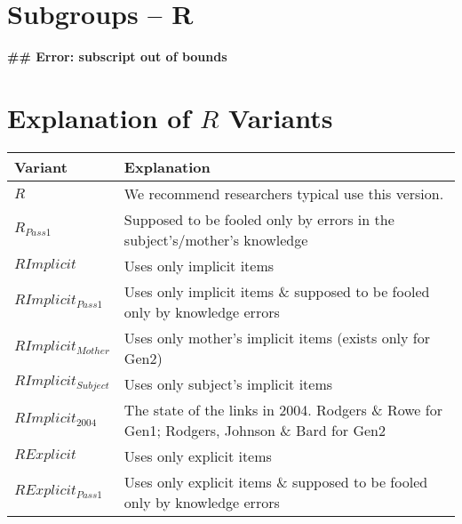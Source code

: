 \documentclass{article}\usepackage{graphicx, color}
\makeatletter
\newenvironment{kframe}{%
 \def\at@end@of@kframe{}%
 \ifinner\ifhmode%
  \def\at@end@of@kframe{\end{minipage}}%
  \begin{minipage}{\columnwidth}%
 \fi\fi%
 \def\FrameCommand##1{\hskip\@totalleftmargin \hskip-\fboxsep
 \colorbox{shadecolor}{##1}\hskip-\fboxsep
     \hskip-\linewidth \hskip-\@totalleftmargin \hskip\columnwidth}%
 \MakeFramed {\advance\hsize-\width
   \@totalleftmargin\z@ \linewidth\hsize
   \@setminipage}}%
 {\par\unskip\endMakeFramed%
 \at@end@of@kframe}
\makeatother
\begin{document}
\section{Subgroups --  R }\begin{kframe}

{\ttfamily\noindent\bfseries\textcolor{errorcolor}{\#\# Error: subscript out of bounds}}\end{kframe}

\section{Explanation of $R$ Variants}
\begin{tabular}{l l}
\textbf{Variant} & \textbf{Explanation} \\
\hline
$R$ & We recommend researchers typical use this version. \\
$R_{Pass1}$ & Supposed to be fooled only by errors in the subject's/mother's knowledge \\
\hline
$RImplicit$ & Uses only implicit items \\
$RImplicit_{Pass1}$ & Uses only implicit items \& supposed to be fooled only by knowledge errors \\
$RImplicit_{Mother}$ & Uses only mother's implicit items (exists only for Gen2)\\
$RImplicit_{Subject}$ & Uses only subject's implicit items\\
$RImplicit_{2004}$ & The state of the links in 2004.  Rodgers \& Rowe for Gen1; Rodgers, Johnson \& Bard for Gen2 \\
\hline
$RExplicit$ & Uses only explicit items \\
$RExplicit_{Pass1}$ & Uses only explicit items \& supposed to be fooled only by knowledge errors \\

\hline
\end{tabular}
\end{document}
